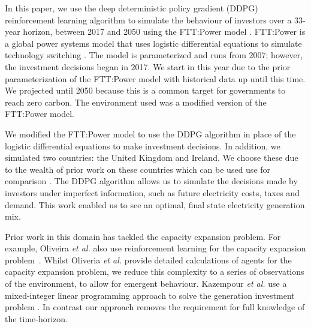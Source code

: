 \documentclass{article}
\begin{document}
In this paper, we use the deep deterministic policy gradient (DDPG) reinforcement learning algorithm to simulate the behaviour of investors over a 33-year horizon, between 2017 and 2050 using the FTT:Power model \cite{Hunt2016a}. FTT:Power is a global power systems model that uses logistic differential equations to simulate technology switching \cite{Mercure2012}. The model is parameterized and runs from 2007; however, the investment decisions began in 2017. We start in this year due to the prior parameterization of the FTT:Power model with historical data up until this time. We projected until 2050 because this is a common target for governments to reach zero carbon. The environment used was a modified version of the FTT:Power model. 

We modified the FTT:Power model to use the DDPG algorithm in place of the logistic differential equations to make investment decisions. In addition, we simulated two countries: the United Kingdom and Ireland. We choose these due to the wealth of prior work on these countries which can be used use for comparison \cite{Hall2016, Hughes2010}. The DDPG algorithm allows us to simulate the decisions made by investors under imperfect information, such as future electricity costs, taxes and demand. This work enabled us to see an optimal, final state electricity generation mix.


Prior work in this domain has tackled the capacity expansion problem. For example, Oliveira \textit{et al.} also use reinforcement learning for the capacity expansion problem~\cite{Oliveira2018}. Whilst Oliveria \textit{et al.} provide detailed calculations of agents for the capacity expansion problem, we reduce this complexity to a series of observations of the environment, to allow for emergent behaviour. Kazempour \textit{et al.} use a mixed-integer linear programming approach to solve the generation investment problem \cite{Kazempour2011}. In contrast our approach removes the requirement for full knowledge of the time-horizon. %
\end{document}
